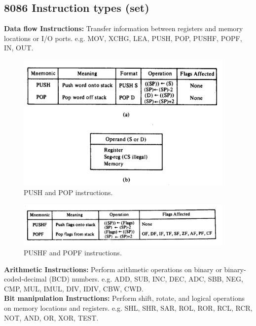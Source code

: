 \documentclass[12pt, a4paper]{scrartcl}
\begin{document}
	\subsection{8086 Instruction types (set)}
	\textbf{Data flow Instructions: }Transfer information between registers and memory locations or I/O ports. e.g. MOV, XCHG, LEA, PUSH, POP, PUSHF, POPF, IN, OUT.\\ 
	\begin{figure}[h]
		\centering
		\includegraphics[width=0.95\textwidth]{images/pushpop.png}
		\caption{PUSH and POP instructions.}
		\label{image-9}
	\end{figure}
	\begin{figure}[h]
		\centering
		\includegraphics[width=0.95\textwidth]{images/pushfpopf.png}
		\caption{PUSHF and POPF instructions.}
		\label{image-10}
	\end{figure}
	
	\textbf{Arithmetic Instructions: }Perform arithmetic operations on binary or binary-coded-decimal (BCD) numbers. e.g. ADD, SUB, INC, DEC, ADC, SBB, NEG, CMP, MUL, IMUL, DIV, IDIV, CBW, CWD.\\ 
	
	\textbf{Bit manipulation Instructions: }Perform shift, rotate, and logical operations on memory locations and registers. e.g. SHL, SHR, SAR, ROL, ROR, RCL, RCR, NOT, AND, OR, XOR, TEST.\\ 
	
\end{document}
